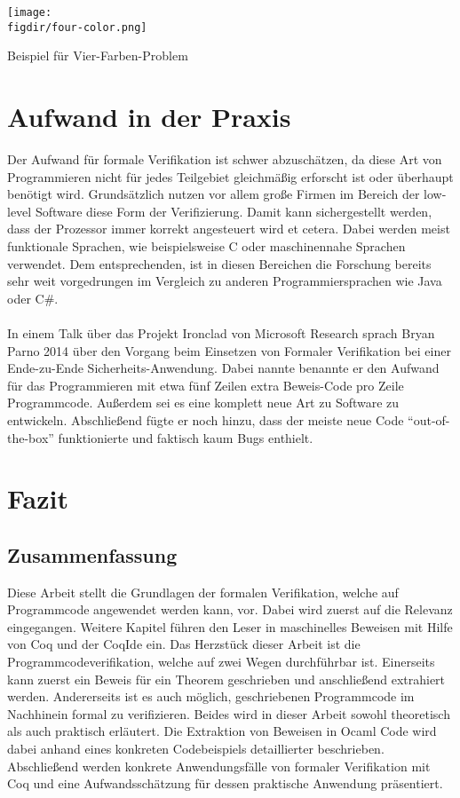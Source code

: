 \begin{minipage}{\textwidth}
	\centering
	\captionsetup{type=figure}
	\texttt{[image: \\figdir/four-color.png]}
	\caption{Beispiel für Vier-Farben-Problem}
	\label{fig:four-color}
\end{minipage}

\section{Aufwand in der Praxis}
Der Aufwand für formale Verifikation ist schwer abzuschätzen, da diese Art von Programmieren nicht für jedes Teilgebiet gleichmäßig erforscht ist oder überhaupt benötigt wird. Grundsätzlich nutzen vor allem große Firmen im Bereich der low-level Software diese Form der Verifizierung. Damit kann sichergestellt werden, dass der Prozessor immer korrekt angesteuert wird et cetera. Dabei werden meist funktionale Sprachen, wie beispielsweise C oder maschinennahe Sprachen verwendet. Dem entsprechenden, ist in diesen Bereichen die Forschung bereits sehr weit vorgedrungen im
Vergleich zu anderen Programmiersprachen wie Java oder C\#.\\
\\
In einem Talk über das Projekt Ironclad von Microsoft Research sprach Bryan Parno 2014 über den Vorgang beim Einsetzen von Formaler Verifikation bei einer Ende-zu-Ende Sicherheits-Anwendung. Dabei nannte benannte er den Aufwand für das Programmieren mit etwa fünf Zeilen extra Beweis-Code pro Zeile Programmcode. Außerdem sei es eine komplett neue Art zu Software zu entwickeln. Abschließend fügte er noch hinzu, dass der meiste neue Code "`out-of-the-box"' funktionierte und faktisch kaum Bugs enthielt.\cite{IRONCLAD01:FV}

\section{Fazit}

\subsection{Zusammenfassung}
Diese Arbeit stellt die Grundlagen der formalen Verifikation, welche auf Programmcode angewendet werden kann, vor. Dabei wird zuerst auf die Relevanz eingegangen. Weitere Kapitel führen den Leser in maschinelles Beweisen mit Hilfe von Coq und der CoqIde ein. Das Herzstück dieser Arbeit ist die Programmcodeverifikation, welche auf zwei Wegen durchführbar ist. Einerseits kann zuerst ein Beweis für ein Theorem geschrieben und anschließend extrahiert werden. Andererseits ist es auch möglich, geschriebenen Programmcode im Nachhinein formal zu verifizieren. Beides wird in dieser Arbeit sowohl theoretisch als auch praktisch erläutert. Die Extraktion von Beweisen in Ocaml Code wird dabei anhand eines konkreten Codebeispiels detaillierter beschrieben. Abschließend werden konkrete Anwendungsfälle von formaler Verifikation mit Coq und eine Aufwandsschätzung für dessen praktische Anwendung präsentiert.

